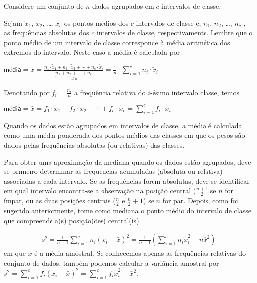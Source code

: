 \label{\detokenize{PE104-A:sec-para-saber-mais}}\label{\detokenize{PE104-A::doc}}\label{\detokenize{PE104-A:para-saber-mais}}



Considere um conjunto de \(n\) dados agrupados em \(c\) intervalos de classe.

Sejam \(\tilde{x}_{1}\), \(\tilde{x}_{2}\), …, \(\tilde{x}_{c}\) os pontos médios dos \(c\) intervalos de classe e, \(n_1\), \(n_2\), …, \(n_c\) ,  as frequências absolutas dos \(c\) intervalos de classe, respectivamente. Lembre que o ponto médio de um intervalo de classe  corresponde à média aritmética dos extremos do intervalo. Neste caso a média é calculada por

\(\textsf{média}=\bar{x}=\frac{n_1\cdot \tilde{x}_{1}+n_2\cdot \tilde{x}_{2}+\cdots+n_c\cdot \tilde{x}_{c}}{\underbrace{n_1+n_2+\cdots+n_c}_{=n}}=\frac{1}{n}\cdot \displaystyle{\sum^c_{i=1}}n_i\cdot \tilde{x}_i\)

Denotando por \(f_i=\frac{n_i}{n}\) a frequência relativa do \(i\)-ésimo intervalo classe, temos

\(\textsf{média}=\bar{x}=f_1\cdot \tilde{x}_{1}+f_2\cdot \tilde{x}_{2}+\cdots +f_c\cdot \tilde{x}_{c}=\displaystyle{\sum^c_{i=1}}f_i\cdot \tilde{x}_i\)

Quando os dados estão agrupados em intervalos de classe, a média é calculada como uma média ponderada dos pontos médios das classes em que os pesos são dados pelas frequências absolutas (ou relativas) das classes.


Para obter uma aproximação da mediana quando os dados estão agrupados, deve-se primeiro determinar as frequências acumuladas (absoluta ou relativa) associadas a cada intervalo. Se as frequências forem absolutas, deve-se identificar em qual intervalo encontra-se a observação na posição central (\(\frac{n+1}{2}\) se \(n\) for ímpar, ou as duas posições centrais (\(\frac{n}{2}\) e \(\frac{n}{2}+1\)) se \(n\) for par. Depois, como foi sugerido anteriormente, tome como mediana o ponto médio do intervalo de classe que compreende a(s) posição(ões) central(is).

\begin{equation*}
\begin{split}s^2 = \frac{1}{n-1}\sum^c_{i=1}n_i(\tilde{x}_i-\bar{x})^2=\frac{1}{n-1}\left(\sum^c_{i=1}n_i\tilde{x}^2_i- n\bar{x}^2\right )\end{split}
\end{equation*}
em que \(\bar{x}\) é a média amostral. Se conhecemos apenas as frequências relativas do conjunto de dados, também podemos calcular a variância amostral por \(s^2=\displaystyle{\sum^c_{i=1}}f_i(\tilde{x}_i-\bar{x})^2=\displaystyle{\sum^c_{i=1}}f_i\tilde{x}^2_i -\bar{x}^2\).

